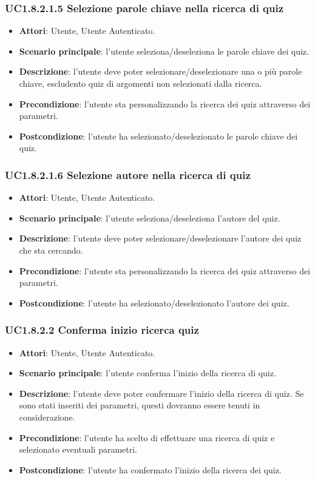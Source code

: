 \subsubsection{UC1.8.2.1.5 Selezione parole chiave nella ricerca di quiz}
\begin{itemize}
\item \textbf{Attori}: Utente, Utente Autenticato.
\item \textbf{Scenario principale}: l'utente seleziona/deseleziona le parole chiave dei quiz.
\item \textbf{Descrizione}: l'utente deve poter selezionare/deselezionare una o più parole chiave, escludento quiz di argomenti non selezionati dalla ricerca.
\item \textbf{Precondizione}: l'utente sta personalizzando la ricerca dei quiz attraverso dei parametri.
\item \textbf{Postcondizione}: l'utente ha selezionato/deselezionato le parole chiave dei quiz.
\end{itemize}
\subsubsection{UC1.8.2.1.6 Selezione autore nella ricerca di quiz}
\begin{itemize}
\item \textbf{Attori}: Utente, Utente Autenticato.
\item \textbf{Scenario principale}: l'utente seleziona/deseleziona l'autore del quiz.
\item \textbf{Descrizione}: l'utente deve poter selezionare/deselezionare l'autore dei quiz che sta cercando.
\item \textbf{Precondizione}: l'utente sta personalizzando la ricerca dei quiz attraverso dei parametri.
\item \textbf{Postcondizione}: l'utente ha selezionato/deselezionato l'autore dei quiz.
\end{itemize}
\subsubsection{UC1.8.2.2 Conferma inizio ricerca quiz}
\begin{itemize}
\item \textbf{Attori}: Utente, Utente Autenticato.
\item \textbf{Scenario principale}: l'utente conferma l'inizio della ricerca di quiz.
\item \textbf{Descrizione}: l'utente deve poter confermare l'inizio della ricerca di  quiz. Se sono stati inseriti dei parametri, questi dovranno essere tenuti in considerazione.
\item \textbf{Precondizione}: l'utente ha scelto di effettuare una ricerca di quiz e selezionato eventuali parametri.
\item \textbf{Postcondizione}: l'utente ha confermato l'inizio della ricerca dei quiz.
\end{itemize}
